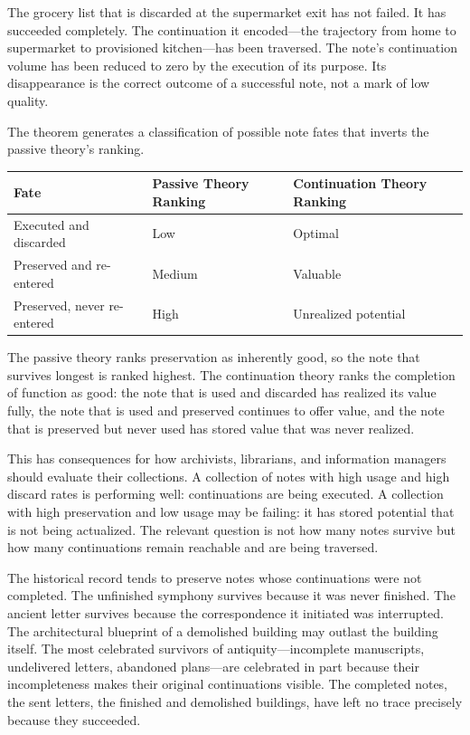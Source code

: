 \documentclass[12pt, a4paper]{article}
\theoremstyle{plain}
\theoremstyle{definition}
\theoremstyle{remark}
\begin{document}
The grocery list that is discarded at the supermarket exit has not failed. It has
succeeded completely. The continuation it encoded---the trajectory from home to
supermarket to provisioned kitchen---has been traversed. The note's continuation
volume has been reduced to zero by the execution of its purpose. Its
disappearance is the correct outcome of a successful note, not a mark of
low quality.

The theorem generates a classification of possible note fates that inverts the
passive theory's ranking.

\begin{center}
\begin{tabular}{lll}
\toprule
Fate & Passive Theory Ranking & Continuation Theory Ranking \\
\midrule
Executed and discarded & Low & Optimal \\
Preserved and re-entered & Medium & Valuable \\
Preserved, never re-entered & High & Unrealized potential \\
\bottomrule
\end{tabular}
\end{center}

The passive theory ranks preservation as inherently good, so the note that
survives longest is ranked highest. The continuation theory ranks the completion
of function as good: the note that is used and discarded has realized its value
fully, the note that is used and preserved continues to offer value, and the note
that is preserved but never used has stored value that was never realized.

This has consequences for how archivists, librarians, and information managers
should evaluate their collections. A collection of notes with high usage and high
discard rates is performing well: continuations are being executed. A collection
with high preservation and low usage may be failing: it has stored potential that
is not being actualized. The relevant question is not how many notes survive but
how many continuations remain reachable and are being traversed.

The historical record tends to preserve notes whose continuations were not
completed. The unfinished symphony survives because it was never finished. The
ancient letter survives because the correspondence it initiated was interrupted.
The architectural blueprint of a demolished building may outlast the building
itself. The most celebrated survivors of antiquity---incomplete manuscripts,
undelivered letters, abandoned plans---are celebrated in part because their
incompleteness makes their original continuations visible. The completed notes,
the sent letters, the finished and demolished buildings, have left no trace
precisely because they succeeded.
\end{document}
